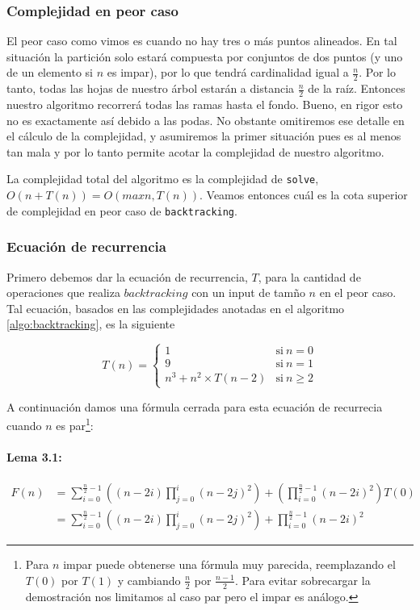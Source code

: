 \subsubsection{Complejidad en peor caso}
El peor caso como vimos es cuando no hay tres o más puntos alineados. En tal situación la partición solo estará compuesta por conjuntos de dos puntos (y uno de un elemento si $n$ es impar), por lo que tendrá cardinalidad igual a $\frac{n}{2}$. Por lo tanto, todas las hojas de nuestro árbol estarán a distancia $\frac{n}{2}$ de la raíz. Entonces nuestro algoritmo recorrerá todas las ramas hasta el fondo. Bueno, en rigor esto no es exactamente así debido a las podas. No obstante omitiremos ese detalle en el cálculo de la complejidad, y asumiremos la primer situación pues es al menos tan mala y por lo tanto permite acotar la complejidad de nuestro algoritmo.

La complejidad total del algoritmo es la complejidad de \texttt{solve}, $O(n + T(n)) = O(max{n, T(n)})$. Veamos entonces cuál es la cota superior de complejidad en peor caso de \texttt{backtracking}. 

\subsubsection{Ecuación de recurrencia}
Primero debemos dar la ecuación de recurrencia, $T$, para la cantidad de operaciones que realiza $backtracking$ con un input de tamño $n$ en el peor caso. Tal ecuación, basados en las complejidades anotadas en el algoritmo \ref{algo:backtracking}, es la siguiente

\begin{equation}
 \label{eq:aqui-le-mostramos-como-hacerle-la-llave-grande}
 T(n) = \left\{
     \begin{array}{ll}
 1      & \mathrm{si\ } n = 0 \\
 9      & \mathrm{si\ } n = 1 \\
 n^3 + n^2\times T(n-2)     & \mathrm{si\ } n \geq 2
     \end{array}
   \right.
\end{equation}

A continuación damos una fórmula cerrada para esta ecuación de recurrecia cuando $n$ es par\footnote{Para $n$ impar puede obtenerse una fórmula muy parecida, reemplazando el $T(0)$ por $T(1)$ y cambiando $\frac{n}{2}$ por $\frac{n-1}{2}$. Para evitar sobrecargar la demostración nos limitamos al caso par pero el impar es análogo.}:

\paragraph{Lema 3.1:} 
\begin{equation}
\begin{aligned}
  F(n) &= \sum_{i=0}^{\frac{n}{2}-1} \left((n-2i) \prod_{j=0}^{i}(n-2j)^2\right) + \left(\prod_{i=0}^{\frac{n}{2}-1}(n-2i)^2\right) T(0)\\
  &= \sum_{i=0}^{\frac{n}{2}-1} \left((n-2i) \prod_{j=0}^{i}(n-2j)^2\right) + \prod_{i=0}^{\frac{n}{2}-1}(n-2i)^2
\end{aligned}
\end{equation}

